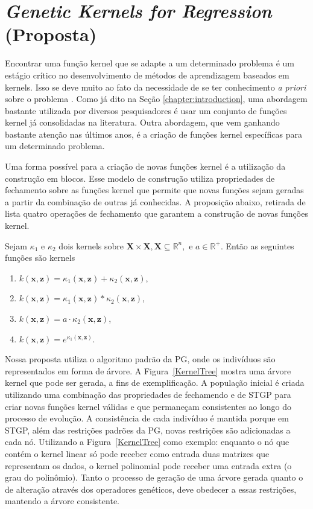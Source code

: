 \chapter{\textit{Genetic Kernels for Regression} (Proposta)} \label{chapter:gkr}
Encontrar uma função kernel que se adapte a um determinado problema é um estágio crítico no desenvolvimento de métodos de aprendizagem baseados em kernels. Isso se deve muito ao fato da necessidade de se ter conhecimento \textit{a priori} sobre o problema \cite{shawe2004}. Como já dito na Seção \ref{chapter:introduction}, uma abordagem bastante utilizada por diversos pesquisadores é usar um conjunto de funções kernel já consolidadas na literatura. Outra abordagem, que vem ganhando bastante atenção nas últimos anos, é a criação de funções kernel específicas para um determinado problema.

Uma forma possível para a criação de novas funções kernel é a utilização da construção em blocos. Esse modelo de construção utiliza propriedades de fechamento sobre as funções kernel que permite que novas funções sejam geradas a partir da combinação de outras já conhecidas. A proposição abaixo, retirada de \cite{shawe2004} lista quatro operações de fechamento que garantem a construção de novas funções kernel.

{ \label{Prop1}
Sejam $\kappa_1$ e $\kappa_2$ dois kernels sobre $\mathbf{X} \times \mathbf{X}, \mathbf{X} \subseteq
\mathbb{R}^n,$ e $a \in \mathbb{R}^+$. Então as seguintes funções são kernels

\begin{enumerate}
\item $k(\mathbf{x},\mathbf{z}) = \kappa_1(\mathbf{x},\mathbf{z}) + \kappa_2(\mathbf{x},\mathbf{z})$,
\item $k(\mathbf{x},\mathbf{z}) = \kappa_1(\mathbf{x},\mathbf{z}) * \kappa_2(\mathbf{x},\mathbf{z})$,
\item $k(\mathbf{x},\mathbf{z}) = a \cdot \kappa_2(\mathbf{x},\mathbf{z})$,
\item $k(\mathbf{x},\mathbf{z}) = e^{\kappa_1(\mathbf{x},\mathbf{z})}$.
\end{enumerate}
}

Nossa proposta utiliza o algoritmo padrão da PG, onde os indivíduos são representados em forma de árvore. A Figura~\ref{KernelTree} mostra uma árvore kernel que pode ser gerada, a fins de exemplificação. A população inicial é criada utilizando uma combinação das propriedades de fechamendo e de STGP para criar novas funções kernel válidas e que permaneçam consistentes ao longo do processo de evolução. A consistência de cada indivíduo é mantida porque em STGP, além das restrições padrões da PG, novas restrições são adicionadas a cada nó. Utilizando a Figura~\ref{KernelTree} como exemplo: enquanto o nó que contém o kernel linear só pode receber como entrada duas matrizes que representam os dados, o kernel polinomial pode receber uma entrada extra (o grau do polinômio). Tanto o processo de geração de uma árvore gerada quanto o de alteração através dos operadores genéticos, deve obedecer a essas restrições, mantendo a árvore consistente.

